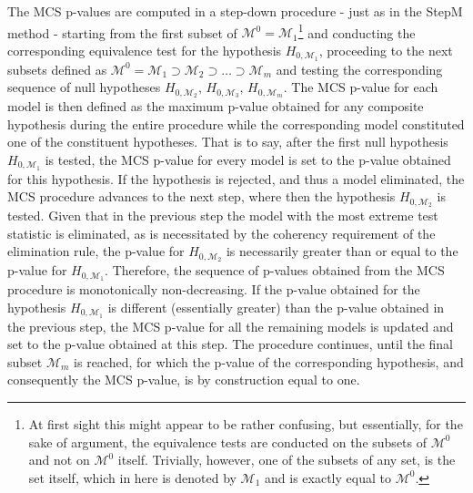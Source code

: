 \documentclass{article} %
\begin{document}
	The MCS p-values are computed in a step-down procedure - just as in the StepM method - starting from the first subset of $\mathcal{M}^0 = \mathcal{M}_1$\footnote{At first sight this might appear to be rather confusing, but essentially, for the sake of argument, the equivalence tests are conducted on the subsets of $\mathcal{M}^0$ and not on $\mathcal{M}^0$ itself. Trivially, however, one of the subsets of any set, is the set itself, which in here is denoted by $\mathcal{M}_1$ and is exactly equal to $\mathcal{M}^0$.} and conducting the corresponding equivalence test for the hypothesis $H_{0,\mathcal{M}_1}$, proceeding to the next subsets defined as $\mathcal{M}^0 = \mathcal{M}_1 \supset \mathcal{M}_2 \supset \dots \supset \mathcal{M}_m$ and testing the corresponding sequence of null hypotheses $ H_{0,\mathcal{M}_2}, \, H_{0,\mathcal{M}_3}, \, H_{0,\mathcal{M}_m}$. The MCS p-value for each model is then defined as the maximum p-value obtained for any composite hypothesis during the entire procedure while the corresponding model constituted one of the constituent hypotheses. That is to say, after the first null hypothesis $H_{0,\mathcal{M}_1}$ is tested, the MCS p-value for every model is set to the p-value obtained for this hypothesis. If the hypothesis is rejected, and thus a model eliminated, the MCS procedure advances to the next step, where then the hypothesis $H_{0,\mathcal{M}_2}$ is tested. Given that in the previous step the model with the most extreme test statistic is eliminated, as is necessitated by the coherency requirement of the elimination rule, the p-value for $H_{0,\mathcal{M}_2}$ is necessarily greater than or equal to the p-value for $H_{0,\mathcal{M}_1}$. Therefore, the sequence of p-values obtained from the MCS procedure is monotonically non-decreasing. If the p-value obtained for the hypothesis $H_{0,\mathcal{M}_1}$ is different (essentially greater) than the p-value obtained in the previous step, the MCS p-value for all the remaining models is updated and set to the p-value obtained at this step. The procedure continues, until the final subset $\mathcal{M}_m$ is reached, for which the p-value of the corresponding hypothesis, and consequently the MCS p-value, is by construction equal to one. 
	
\end{document}
